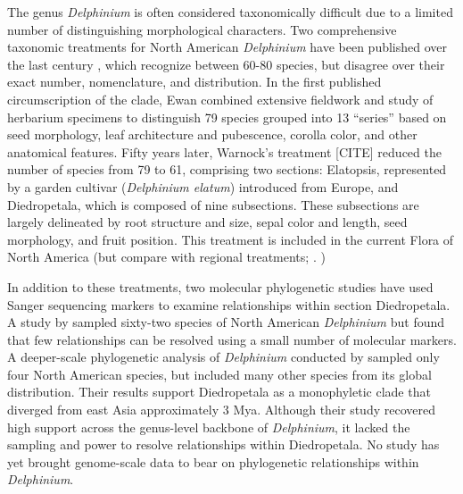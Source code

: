\documentclass[11pt]{article}
\begin{document}
The genus \emph{Delphinium} is often considered taxonomically difficult due to a 
limited number of 
distinguishing
morphological characters. Two comprehensive 
taxonomic treatments for North American \emph{Delphinium} have been published over 
the last century \citep{benson_synopsis_1946,ewan_1945, warnock_1997}, %
which recognize between 60-80 species, but disagree over their exact number, 
nomenclature, and distribution. 
% 
In the first published circumscription of the clade, Ewan combined extensive 
fieldwork and study of herbarium specimens to distinguish 79 species grouped 
into 13 “series” based on seed morphology, leaf architecture and pubescence, 
corolla color, and other anatomical features. 
% 
Fifty years later, Warnock’s treatment [CITE] reduced the number of species 
from 79 to 61, comprising two sections: Elatopsis, represented by a garden 
cultivar (\emph{Delphinium elatum}) introduced from Europe, and 
Diedropetala, which is composed of nine subsections.
%
These subsections are largely delineated by root structure and size, 
sepal color and length, seed morphology, and fruit position.
% 
This treatment is included in the current Flora of North America 
\citep{...} (but compare with regional treatments;
\cite{ackerfield_flora_2022,chambers_comments_2018,holmgren_2012,koontz_2012}.
)


In addition to these treatments, two molecular phylogenetic studies have used
Sanger sequencing markers to examine relationships within section Diedropetala.
% 
A study by \citet{koontz_using_2004} sampled sixty-two species of 
North American \emph{Delphinium} but found that few relationships can
be resolved using a small number of molecular markers. 
% 
A deeper-scale phylogenetic analysis of \emph{Delphinium} conducted
by \cite{jabbour_phylogeny_2012} sampled only four North American species,
but included many other species from its global distribution.
Their results support Diedropetala as a monophyletic clade that diverged
from east Asia approximately 3 Mya. 
% 
Although their study recovered high support across the genus-level 
backbone of \emph{Delphinium}, it lacked the sampling and power to 
resolve relationships within Diedropetala.
% 
No study has yet brought genome-scale data to bear on phylogenetic 
relationships within \emph{Delphinium}.
\end{document}
